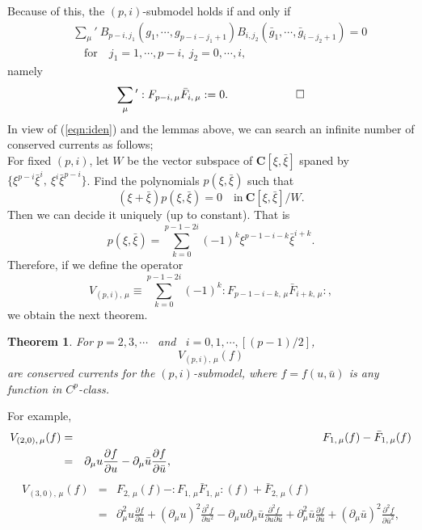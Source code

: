 \documentclass[makeidx,12pt,openany]{report}
\newtheorem{thm}[df]{Theorem}
\begin{document}
Because of this, the $(p,i)$-submodel holds if and only if
\begin{eqnarray}
&& \sum_{\mu}{}'\ B_{p-i,j_1}(g_1,\cdots,g_{p-i-j_1+1}) 
    B_{i,j_2}(\bar{g}_1,\cdots,\bar{g}_{i-j_2+1})=0 \\
  && \quad \mbox{for} \quad j_1=1,\cdots, p-i, \ j_2=0,\cdots,i, 
   \nonumber
\end{eqnarray}
namely
\begin{equation}
 \sum_{\mu}{}':F_{p-i,\, \mu}\bar{F}_{i,\, \mu}:=0. \qquad \qquad \qed
\end{equation}
%
In view of (\ref{eqn:iden}) and the lemmas above, 
we can search an infinite number of conserved currents as follows; \\
For fixed $(p,i)$, let $W$ be the vector subspace of 
$\mathbf{C}[\xi, \bar{\xi}]$ spaned by 
$\{ \xi^{p-i}\bar{\xi}^i, \ \xi^i\bar{\xi}^{p-i} \}$. 
Find the polynomials $p(\xi,\bar{\xi})$ such that
\begin{equation}
 (\xi+\bar{\xi})p(\xi,\bar{\xi})=0 \quad \mbox{in} \ 
 {\mathbf{C}}[\xi, \bar{\xi}]/W.
\end{equation}
Then we can decide it uniquely (up to constant). That is
\begin{equation}
 p(\xi,\bar{\xi})=\sum_{k=0}^{p-1-2i}(-1)^k \xi^{p-1-i-k}\bar{\xi}^{i+k}.
\end{equation}
Therefore, if we define the operator 
\begin{equation}
V_{(p,i),\, \mu} \equiv 
  \sum_{k=0}^{p-1-2i}(-1)^k :F_{p-1-i-k,\, \mu}\bar{F}_{{i+k},\, \mu}:,
\end{equation}
we obtain the next theorem.
\begin{thm}For $p=2,3,\cdots $ \ and \ $i=0,1,\cdots,[(p-1)/2]$,
\begin{equation}
 V_{(p,i),\, \mu}(f)  
 \label{eqn:5-1}
\end{equation}
are conserved currents for the $(p,i)$-submodel, 
where $f=f(u,\bar{u})$ is any function in $C^p$-class. 
\end{thm}
For example, 
\begin{eqnarray}
 V_{(2,0),\, \mu}(f) &=& F_{1,\, \mu}(f)-\bar{F}_{1,\, \mu}(f) \nonumber \\
   &=& \partial_{\mu}u \frac{\partial f}{\partial u}
      -\partial_{\mu}\bar{u} \frac{\partial f}{\partial \bar{u}},
      \hspace{75mm}
\end{eqnarray}
\begin{eqnarray}
 V_{(3,0),\, \mu}(f) &=& F_{2,\, \mu}(f)
                    -:F_{1,\, \mu}\bar{F}_{1,\, \mu}:(f)
                    +\bar{F}_{2,\, \mu}(f) \nonumber \\
   &=& \partial_{\mu}^2 u \frac{\partial f}{\partial u}
      +(\partial_{\mu}u)^2 \frac{\partial^2 f}{\partial u^2}
      -\partial_{\mu}u \partial_{\mu}\bar{u} 
        \frac{\partial^2 f}{\partial u \partial \bar{u}}
      +\partial_{\mu}^2 \bar{u} \frac{\partial f}{\partial \bar{u}}
      +(\partial_{\mu}\bar{u})^2 \frac{\partial^2 f}{\partial \bar{u}^2},
      \nonumber \\
   && 
\end{eqnarray}
\end{document}
